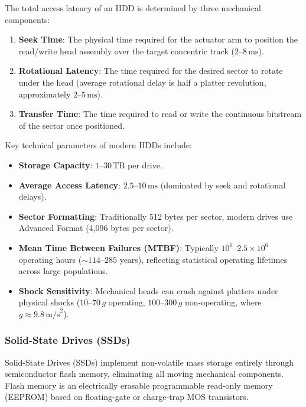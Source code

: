 
The total access latency of an HDD is determined by three mechanical components:
\begin{enumerate}
    \item \textbf{Seek Time}: The physical time required for the actuator arm to position the read/write head assembly over the target concentric track ($2\text{--}8\,\text{ms}$).
    \item \textbf{Rotational Latency}: The time required for the desired sector to rotate under the head (average rotational delay is half a platter revolution, approximately $2\text{--}5\,\text{ms}$).
    \item \textbf{Transfer Time}: The time required to read or write the continuous bitstream of the sector once positioned.
\end{enumerate}

Key technical parameters of modern HDDs include:
\begin{itemize}
    \item \textbf{Storage Capacity}: $1\text{--}30\,\text{TB}$ per drive.
    \item \textbf{Average Access Latency}: $2.5\text{--}10\,\text{ms}$ (dominated by seek and rotational delays).
    \item \textbf{Sector Formatting}: Traditionally 512 bytes per sector, modern drives use Advanced Format (4,096 bytes per sector).
    \item \textbf{Mean Time Between Failures (MTBF)}: Typically $10^6\text{--}2.5 \times 10^6$ operating hours ($\sim 114\text{--}285$ years), reflecting statistical operating lifetimes across large populations.
    \item \textbf{Shock Sensitivity}: Mechanical heads can crash against platters under physical shocks ($10\text{--}70\,g$ operating, $100\text{--}300\,g$ non-operating, where $g \approx 9.8\,\text{m/s}^2$).
\end{itemize}

\subsubsection{Solid-State Drives (SSDs)}

Solid-State Drives (SSDs) implement non-volatile mass storage entirely through semiconductor flash memory, eliminating all moving mechanical components. Flash memory is an electrically erasable programmable read-only memory (EEPROM) based on floating-gate or charge-trap MOS transistors.

